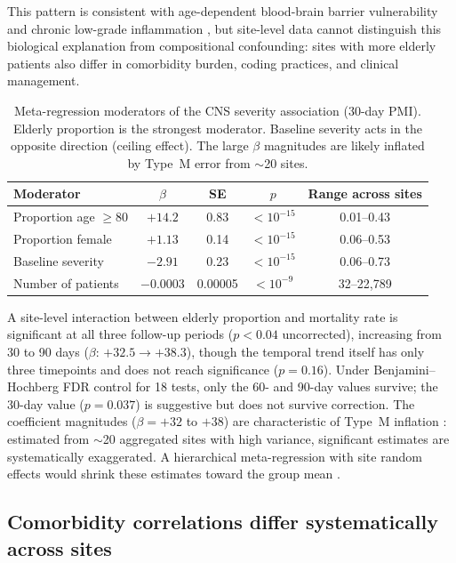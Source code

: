 \documentclass{article}
\begin{document}
This pattern is consistent with age-dependent blood-brain barrier
vulnerability \cite{montagne2015bbb} and chronic low-grade inflammation
\cite{franceschi2018inflammaging}, but site-level data cannot distinguish
this biological explanation from compositional confounding: sites with more
elderly patients also differ in comorbidity burden, coding practices, and
clinical management.

\begin{table}[t]
\centering
\caption{Meta-regression moderators of the CNS severity association (30-day
PMI).  Elderly proportion is the strongest moderator.  Baseline severity
acts in the opposite direction (ceiling effect).  The large $\beta$
magnitudes are likely inflated by Type~M error \cite{gelman2014typeMS} from
$\sim$20 sites.}
\label{tab:moderators}
\begin{tabular}{lcccc}
\toprule
Moderator & $\beta$ & SE & $p$ & Range across sites \\
\midrule
Proportion age $\geq 80$ & $+14.2$ & 0.83 & $< 10^{-15}$ & 0.01--0.43 \\
Proportion female & $+1.13$ & 0.14 & $< 10^{-15}$ & 0.06--0.53 \\
Baseline severity & $-2.91$ & 0.23 & $< 10^{-15}$ & 0.06--0.73 \\
Number of patients & $-0.0003$ & 0.00005 & $< 10^{-9}$ & 32--22{,}789 \\
\bottomrule
\end{tabular}
\end{table}

A site-level interaction between elderly proportion and mortality rate is
significant at all three follow-up periods ($p < 0.04$ uncorrected),
increasing from 30 to 90 days ($\beta$: $+32.5 \to +38.3$), though the
temporal trend itself has only three timepoints and does not reach
significance ($p = 0.16$).  Under Benjamini--Hochberg FDR control for 18
tests, only the 60- and 90-day values survive; the 30-day value
($p = 0.037$) is suggestive but does not survive correction.  The
coefficient magnitudes ($\beta = +32$ to $+38$) are characteristic of
Type~M inflation \cite{gelman2014typeMS}: estimated from $\sim$20
aggregated sites with high variance, significant estimates are
systematically exaggerated.  A hierarchical meta-regression with site random
effects would shrink these estimates toward the group mean
\cite{gelman2012multilevel}.


\subsection{Comorbidity correlations differ systematically across sites}
\end{document}
